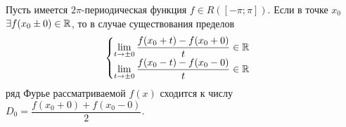 \documentclass[../../main.tex]{subfiles}
\begin{document}
\begin{crl*}
	Пусть имеется $2\pi$-периодическая функция $f\in R([-\pi;\pi])$.
	Если в точке $x_0$ $\exists f(x_0 \pm 0) \in \mathbb{R}$, то в
	случае существования пределов
	\begin{equation}
		\label{18:12}
		\begin{cases}
			\lim\limits_{t \rightarrow \pm 0}{\dfrac
				{f(x_0 + t) - f(x_0 + 0)}{t}} \in \mathbb{R}\\
			\lim\limits_{t \rightarrow \pm 0}{\dfrac
				{f(x_0 - t) - f(x_0 - 0)}{t}} \in \mathbb{R}\\ 
		\end{cases}
	\end{equation}
	ряд Фурье рассматриваемой $f(x)$ сходится к числу
	$D_0 = \dfrac{f(x_0 + 0) + f(x_0 - 0)}{2}$.
	
\end{crl*}
\end{document}
